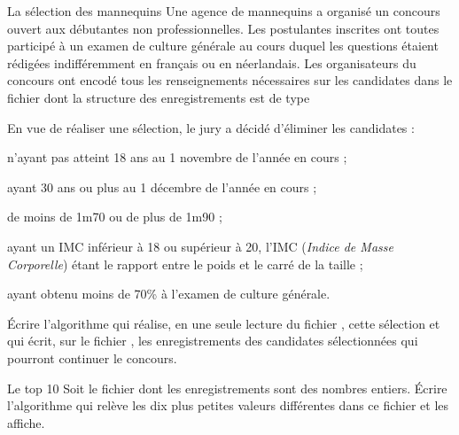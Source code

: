 \begin{Exercice}{La sélection des mannequins}
	Une agence de mannequins a organisé un concours ouvert aux débutantes
	non professionnelles. Les postulantes inscrites ont toutes participé à
	un examen de culture générale au cours duquel les questions étaient
	rédigées indifféremment en français ou en néerlandais. Les
	organisateurs du concours ont encodé tous les renseignements
	nécessaires sur les candidates dans le fichier  dont la structure
	des enregistrements est de type  
	
	
	En vue de réaliser une sélection, le jury a décidé d’éliminer les
	candidates :

	\begin{liste}
		\item 
			n’ayant pas atteint 18 ans au 1 novembre de l’année
			en cours ;
		\item 
			ayant 30 ans ou plus au 1 décembre de l’année en
			cours ;
		\item 
			de moins de 1m70 ou de plus de 1m90 ;
		\item 
			ayant un IMC inférieur à 18 ou supérieur à 20, l’IMC (\textit{Indice de
			Masse Corporelle}) étant le rapport entre le poids et le carré de la
			taille ;
		\item 
			ayant obtenu moins de 70\% à l’examen de culture générale.
	\end{liste}
	
	Écrire l’algorithme qui réalise, en une seule lecture du fichier ,
	cette sélection et qui écrit, sur le fichier , les
	enregistrements des candidates sélectionnées qui pourront continuer le
	concours.
\end{Exercice}

\begin{Exercice}{Le top 10}
	Soit le fichier  dont les enregistrements
	sont des nombres entiers. Écrire l’algorithme qui relève les dix plus
	petites valeurs différentes dans ce fichier et les affiche.
\end{Exercice}

